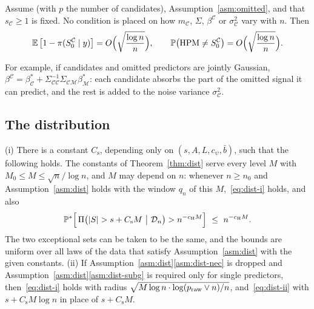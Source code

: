 \begin{theorem}\label{thm:omitted}
Assume  (with $p$ the number of candidates), Assumption~\ref{asm:omitted}, and that $s_{\mathcal C}\ge1$ is fixed. No
condition is placed on how $m_{\mathcal C}$, $\Sigma$, $\beta^{\mathcal C}$ or $\sigma^2_{\mathcal C}$ vary with $n$. Then
\[
  \operatorname{\mathbb{E}}\big[1-\pi(S_0^{\mathcal C}\mid y)\big]=O\Big(\sqrt{\frac{\log n}{n}}\Big),\qquad
  \mathbb{P}\big(\mathrm{HPM}\neq S_0^{\mathcal C}\big)=O\Big(\sqrt{\frac{\log n}{n}}\Big).
\]
\end{theorem}


For example, if candidates and omitted predictors are jointly Gaussian, $\beta^{\mathcal C}=\beta^*_{\mathcal C}+
\Sigma_{\mathcal C\mathcal C}^{-1}\Sigma_{\mathcal C\mathcal M}\beta^*_{\mathcal M}$: each candidate absorbs the part of the
omitted signal it can predict, and the rest is added to the noise variance $\sigma^2_{\mathcal C}$.

\subsection{The distribution}\label{sec:supp-dist}


\begin{proposition}\label{prop:dist}
\textup{(i)} There is a constant $C_{\mathrm s}$, depending only on $(s,A,L,c_\psi,\bar b)$, such that the following holds. The
constants of Theorem~\ref{thm:dist} serve every level $M$ with $M_0\le M\le\sqrt n/\log n$, and $M$ may depend on $n$:
whenever $n\ge n_0$ and Assumption~\ref{asm:dist} holds with the window $q_n$ of this $M$,~\eqref{eq:dist-i} holds, and also
\begin{equation}\label{eq:dist-ii}
  \P^*\Big[\,\Pi\big(\abs{S}>s+C_{\mathrm s}M\ \big|\ \Dn\big)>n^{-c_{\mathrm H} M}\Big]\ \le\ n^{-c_{\mathrm H} M}.
\end{equation}
The two exceptional sets can be taken to be the same, and the bounds are uniform over all laws of the data that satisfy
Assumption~\ref{asm:dist} with the given constants.
\textup{(ii)} If Assumption~\ref{asm:dist}\ref{asm:dist-nec} is dropped and Assumption~\ref{asm:dist}\ref{asm:dist-subg} is
required only for single predictors, then~\eqref{eq:dist-i} holds with radius $\sqrt{M\log n\cdot\log(p_{\mathrm{raw}}\vee n)/n}$,
and~\eqref{eq:dist-ii} with $s+C_{\mathrm s}M\log n$ in place of $s+C_{\mathrm s}M$.
\end{proposition}

